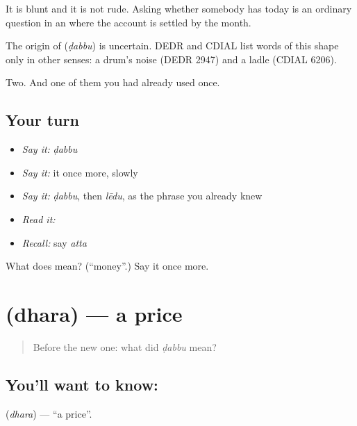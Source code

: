 It is blunt and it is not rude. Asking whether somebody has  today is an ordinary question in an  where the account is settled by the month.

\begin{cousinweb}
The origin of \textbf{} (\emph{ḍabbu}) is uncertain. DEDR and CDIAL list words of this shape only in other senses: a drum's noise (DEDR 2947) and a ladle (CDIAL 6206).
\end{cousinweb}

\begin{grammarlens}[title={What you've built}]
Two. And one of them you had already used once.
\end{grammarlens}

\subsection*{Your turn}
\begin{itemize}
\raggedright
  \item \emph{Say it:} \emph{ḍabbu}
  \item \emph{Say it:} it once more, slowly
  \item \emph{Say it:} \emph{ḍabbu}, then \emph{lēdu}, as the phrase you already knew
  \item \emph{Read it:} \textbf{}
  \item \emph{Recall:} say \emph{atta}
\end{itemize}

\begin{tcolorbox}[breakable,colback=teal!4,colframe=teal!35!black,title={Before you move on}]
What does  mean? (\textquotedblleft{}money\textquotedblright{}.) Say it once more.
\end{tcolorbox}
\section[\texorpdfstring{\te{ధర} (dhara)}{ధర (dhara)}]{ (dhara) — a price}

\label{lesson:TE-C72-price}



\begin{quote}
Before the new one: what did \emph{ḍabbu} mean?
\end{quote}

\subsection*{You'll want to know: }
\textbf{} (\emph{dhara}) — \textquotedblleft{}a price\textquotedblright{}.

